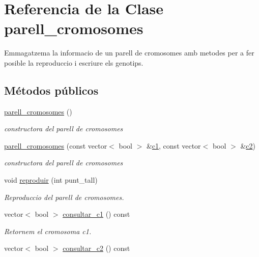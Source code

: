 \hypertarget{classparell__cromosomes}{}\section{Referencia de la Clase parell\+\_\+cromosomes}
\label{classparell__cromosomes}


Emmagatzema la informacio de un parell de cromosomes amb metodes per a fer posible la reproduccio i escriure els genotips.  


\subsection*{Métodos públicos}
\begin{DoxyCompactItemize}
\item 
\hyperlink{classparell__cromosomes_a9d86452d029f65ccf80c8861c4914698}{parell\+\_\+cromosomes} ()
\begin{DoxyCompactList}\small\item\em constructora del parell de cromosomes \end{DoxyCompactList}\item 
\hyperlink{classparell__cromosomes_aa7f0798619677ef4715f2d94ecd39769}{parell\+\_\+cromosomes} (const vector$<$ bool $>$ \&\hyperlink{classparell__cromosomes_ab4d7cfc40f53a1698b4ea3ef1f2cd199}{c1}, const vector$<$ bool $>$ \&\hyperlink{classparell__cromosomes_a888f09ecbc3329b0ee505fb0cb8bf98f}{c2})
\begin{DoxyCompactList}\small\item\em constructora del parell de cromosomes \end{DoxyCompactList}\item 
void \hyperlink{classparell__cromosomes_a70760dca0beb7da1d59f70d8cfca83a5}{reproduir} (int punt\+\_\+tall)
\begin{DoxyCompactList}\small\item\em Reproduccio del parell de cromosomes. \end{DoxyCompactList}\item 
vector$<$ bool $>$ \hyperlink{classparell__cromosomes_a25cf02baa8f399adc798289773729b5e}{consultar\+\_\+c1} () const 
\begin{DoxyCompactList}\small\item\em Retornem el cromosoma c1. \end{DoxyCompactList}\item 
vector$<$ bool $>$ \hyperlink{classparell__cromosomes_a4c29928abe72237272e5e1e219dc3e9d}{consultar\+\_\+c2} () const 

\end{DoxyCompactItemize}
